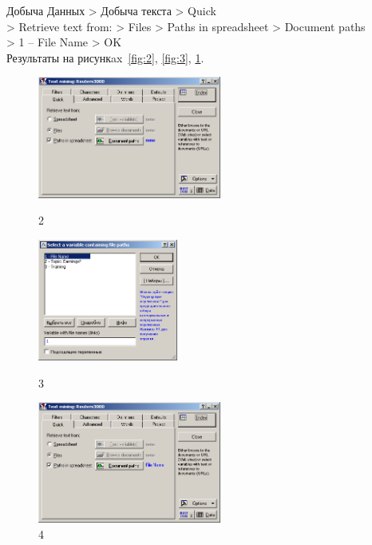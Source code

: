 \newpage

Добыча Данных > Добыча текста > Quick \\
> Retrieve text from: > Files > Paths in spreadsheet > Document paths \\
> 1 – File Name > OK \\

Результаты на рисункax~\ref{fig:2}, \ref{fig:3}, \ref{fig:4}.

\begin{figure}[!h]
  \centering

  \begin{minipage}{0.32\textwidth}
    \centering

    \includegraphics[height=4cm]
    {inc/2.PNG}

    \caption{2}

    \label{fig:2}
  \end{minipage}
  \begin{minipage}{0.32\textwidth}
    \centering

    \includegraphics[height=4cm]
    {inc/3.PNG}

    \caption{3}

    \label{fig:3}
  \end{minipage}
  \begin{minipage}{0.32\textwidth}
    \centering

    \includegraphics[height=4cm]
    {inc/4.PNG}

    \caption{4}

    \label{fig:4}
  \end{minipage}
\end{figure}


